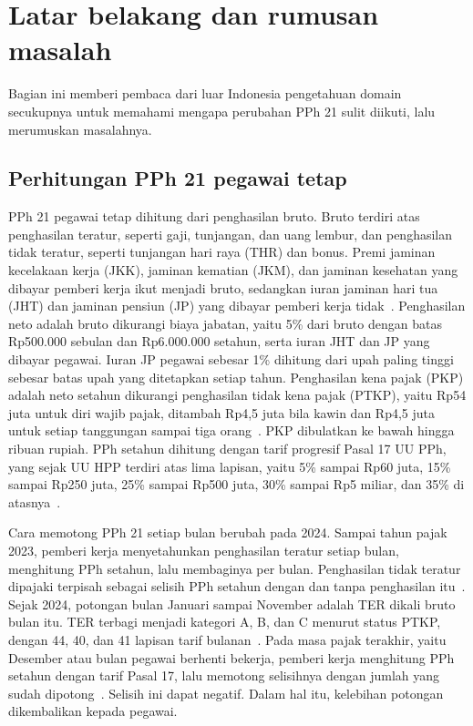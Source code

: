 \section{Latar belakang dan rumusan masalah}
\label{sec:masalah}

Bagian ini memberi pembaca dari luar Indonesia pengetahuan domain secukupnya untuk memahami mengapa perubahan PPh 21 sulit diikuti, lalu merumuskan masalahnya.

\subsection{Perhitungan PPh 21 pegawai tetap}
\label{subsec:pph21}

PPh 21 pegawai tetap dihitung dari penghasilan bruto. Bruto terdiri atas penghasilan teratur, seperti gaji, tunjangan, dan uang lembur, dan penghasilan tidak teratur, seperti tunjangan hari raya (THR) dan bonus. Premi jaminan kecelakaan kerja (JKK), jaminan kematian (JKM), dan jaminan kesehatan yang dibayar pemberi kerja ikut menjadi bruto, sedangkan iuran jaminan hari tua (JHT) dan jaminan pensiun (JP) yang dibayar pemberi kerja tidak~\cite{pmk168_2023}. Penghasilan neto adalah bruto dikurangi biaya jabatan, yaitu 5\% dari bruto dengan batas Rp500.000 sebulan dan Rp6.000.000 setahun, serta iuran JHT dan JP yang dibayar pegawai. Iuran JP pegawai sebesar 1\% dihitung dari upah paling tinggi sebesar batas upah yang ditetapkan setiap tahun. Penghasilan kena pajak (PKP) adalah neto setahun dikurangi penghasilan tidak kena pajak (PTKP), yaitu Rp54 juta untuk diri wajib pajak, ditambah Rp4,5 juta bila kawin dan Rp4,5 juta untuk setiap tanggungan sampai tiga orang~\cite{pmk101_2016}. PKP dibulatkan ke bawah hingga ribuan rupiah. PPh setahun dihitung dengan tarif progresif Pasal 17 UU PPh, yang sejak UU HPP terdiri atas lima lapisan, yaitu 5\% sampai Rp60 juta, 15\% sampai Rp250 juta, 25\% sampai Rp500 juta, 30\% sampai Rp5 miliar, dan 35\% di atasnya~\cite{uu7_2021}.

Cara memotong PPh 21 setiap bulan berubah pada 2024. Sampai tahun pajak 2023, pemberi kerja menyetahunkan penghasilan teratur setiap bulan, menghitung PPh setahun, lalu membaginya per bulan. Penghasilan tidak teratur dipajaki terpisah sebagai selisih PPh setahun dengan dan tanpa penghasilan itu~\cite{per16_2016}. Sejak 2024, potongan bulan Januari sampai November adalah TER dikali bruto bulan itu. TER terbagi menjadi kategori A, B, dan C menurut status PTKP, dengan 44, 40, dan 41 lapisan tarif bulanan~\cite{pp58_2023}. Pada masa pajak terakhir, yaitu Desember atau bulan pegawai berhenti bekerja, pemberi kerja menghitung PPh setahun dengan tarif Pasal 17, lalu memotong selisihnya dengan jumlah yang sudah dipotong~\cite{pmk168_2023}. Selisih ini dapat negatif. Dalam hal itu, kelebihan potongan dikembalikan kepada pegawai.

